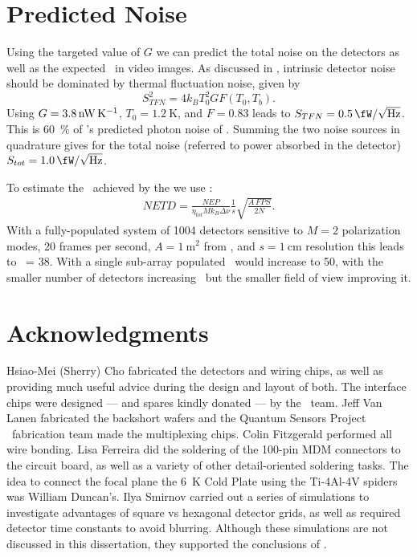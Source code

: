 \section{Predicted Noise} \label{sec:ch5-predicted-noise}

Using the targeted value of $G$ we can predict the total noise on the detectors as well as the expected \NETD\ in video images.
As discussed in , intrinsic detector noise should be dominated by thermal fluctuation noise, given by
\begin{equation}
  S^2_{TFN} = 4 k_B T_0^2 G F(T_0, T_b).
\end{equation}
Using $G = \SI{3.8}{\nW\per\K}$, $T_0 = \SI{1.2}{\K}$, and $F = 0.83$ leads to $S_{TFN} = \Pnoisef{0.5}$.
This is \SI{60}{\percent} of 's predicted photon noise of .
Summing the two noise sources in quadrature gives for the total noise (referred to power absorbed in the detector) $S_{tot} = \Pnoisef{1.0}$.

To estimate the \NETD\ achieved by the \Imager we use :
\begin{align}
  NETD = \frac{NEP}{\eta_{tot} M k_B \Delta \nu} \frac{1}{s} \sqrt{\frac{A\,FPS}{2 N}} .
\end{align}
With a fully-populated system of 1004 detectors sensitive to $M=2$ polarization modes, 20 frames per second, $A = \SI{1}{\m^2}$ from , and $ s = \SI{1}{\cm}$ resolution this leads to \NETD\ = \SI{38}{\mK}.
With a single sub-array populated \NETD\ would increase to \SI{50}{\mK}, with the smaller number of detectors increasing \NETD\ but the smaller field of view improving it. 

\section{Acknowledgments}

Hsiao-Mei (Sherry) Cho fabricated the detectors and wiring chips, as well as providing much useful advice during the design and layout of both.
The interface chips were designed --- and spares kindly donated --- by the \ABS\ team.
Jeff Van Lanen fabricated the backshort wafers and the Quantum Sensors Project \SQUID\ fabrication team made the multiplexing chips.
Colin Fitzgerald performed all wire bonding.
Lisa Ferreira did the soldering of the 100-pin MDM connectors to the circuit board, as well as a variety of other detail-oriented soldering tasks.
The idea to connect the focal plane the \SI{6}{\K} Cold Plate using the Ti-4Al-4V spiders was William Duncan's.
Ilya Smirnov carried out a series of simulations to investigate advantages of square vs hexagonal detector grids, as well as required detector time constants to avoid blurring.
Although these simulations are not discussed in this dissertation, they supported the conclusions of .
